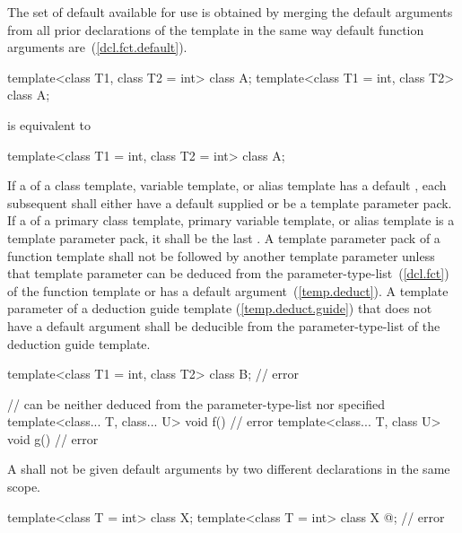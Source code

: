 \pnum
The set of default
available for use is obtained by merging the default arguments
from all prior declarations of the template in the
same way default function arguments are~(\ref{dcl.fct.default}).
\begin{example}

\begin{codeblock}
template<class T1, class T2 = int> class A;
template<class T1 = int, class T2> class A;
\end{codeblock}

is equivalent to

\begin{codeblock}
template<class T1 = int, class T2 = int> class A;
\end{codeblock}
\end{example}

\pnum
If a
of a class template, variable template, or alias template has a default
,
each subsequent
shall either have a default
supplied
or be a template parameter pack. If a 
of a primary class template, primary variable template, or alias template
is a template parameter pack, it shall be the last
.
A template parameter pack of a function template shall not be followed by
another
template parameter unless that template parameter can be deduced from the
parameter-type-list~(\ref{dcl.fct}) of the function template or has a
default argument~(\ref{temp.deduct}).
A template parameter of a deduction guide template (\ref{temp.deduct.guide})
that does not have a default argument
shall be deducible
from the parameter-type-list
of the deduction guide template.
\begin{example}

\begin{codeblock}
template<class T1 = int, class T2> class B;   // error

//  can be neither deduced from the parameter-type-list nor specified
template<class... T, class... U> void f() { } // error
template<class... T, class U> void g() { }    // error
\end{codeblock}
\end{example}

\pnum
A
shall
not be given default arguments by two different declarations in the same scope.
\begin{example}

\begin{codeblock}
template<class T = int> class X;
template<class T = int> class X { @\commentellip@ }; // error
\end{codeblock}
\end{example}

